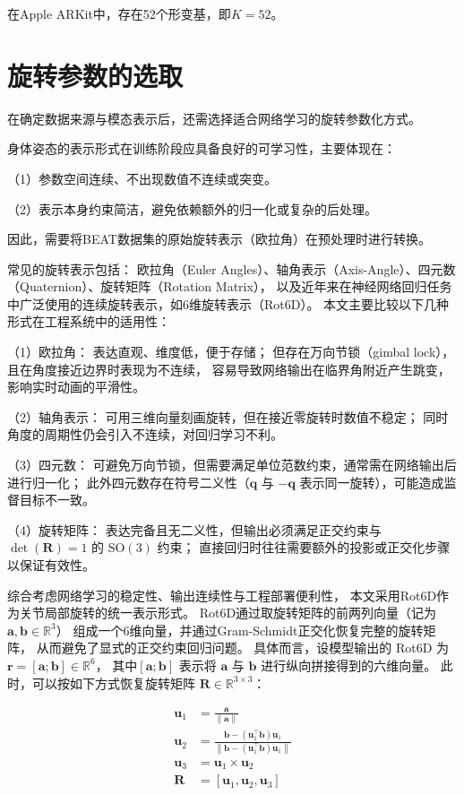 在Apple ARKit中，存在52个形变基，即$K=52$。

\section{旋转参数的选取}

在确定数据来源与模态表示后，还需选择适合网络学习的旋转参数化方式。

身体姿态的表示形式在训练阶段应具备良好的可学习性，主要体现在：

（1）参数空间连续、不出现数值不连续或突变。

（2）表示本身约束简洁，避免依赖额外的归一化或复杂的后处理。

因此，需要将BEAT数据集的原始旋转表示（欧拉角）在预处理时进行转换。

常见的旋转表示包括：
欧拉角（Euler Angles）、轴角表示（Axis-Angle）、四元数（Quaternion）、旋转矩阵（Rotation Matrix），
以及近年来在神经网络回归任务中广泛使用的连续旋转表示，如$6$维旋转表示（Rot6D）\cite{rot6d}。
本文主要比较以下几种形式在工程系统中的适用性：

（1）欧拉角：
表达直观、维度低，便于存储；
但存在万向节锁（gimbal lock），且在角度接近边界时表现为不连续，
容易导致网络输出在临界角附近产生跳变，影响实时动画的平滑性。

（2）轴角表示：
可用三维向量刻画旋转，但在接近零旋转时数值不稳定；
同时角度的周期性仍会引入不连续，对回归学习不利。

（3）四元数：
可避免万向节锁，但需要满足单位范数约束，通常需在网络输出后进行归一化；
此外四元数存在符号二义性（$\mathbf{q}$ 与 $-\mathbf{q}$ 表示同一旋转），可能造成监督目标不一致。

（4）旋转矩阵：
表达完备且无二义性，但输出必须满足正交约束与 $\det(\mathbf{R})=1$ 的 $\mathrm{SO}(3)$ 约束；
直接回归时往往需要额外的投影或正交化步骤以保证有效性。

综合考虑网络学习的稳定性、输出连续性与工程部署便利性，
本文采用Rot6D\cite{rot6d}作为关节局部旋转的统一表示形式。
Rot6D通过取旋转矩阵的前两列向量（记为$\mathbf{a},\mathbf{b}\in\mathbb{R}^3$）
组成一个$6$维向量，并通过Gram-Schmidt正交化恢复完整的旋转矩阵，
从而避免了显式的正交约束回归问题。
具体而言，设模型输出的 Rot6D 为
$\mathbf{r}=[\mathbf{a};\mathbf{b}]\in\mathbb{R}^6$，
其中$[\mathbf{a};\mathbf{b}]$ 表示将 $\mathbf{a}$ 与 $\mathbf{b}$ 进行纵向拼接得到的六维向量。
此时，可以按如下方式恢复旋转矩阵 $\mathbf{R}\in\mathbb{R}^{3\times 3}$：

\begin{align}
\mathbf{u}_1 &= \frac{\mathbf{a}}{\|\mathbf{a}\|} \\
\mathbf{u}_2 &= \frac{\mathbf{b} - (\mathbf{u}_1^\top\mathbf{b})\mathbf{u}_1}{\left\|\mathbf{b} - (\mathbf{u}_1^\top\mathbf{b})\mathbf{u}_1\right\|} \\
\mathbf{u}_3 &= \mathbf{u}_1 \times \mathbf{u}_2 \\
\mathbf{R} &= [\mathbf{u}_1,\mathbf{u}_2,\mathbf{u}_3]
\label{eq:rot6d_conversion}
\end{align}


